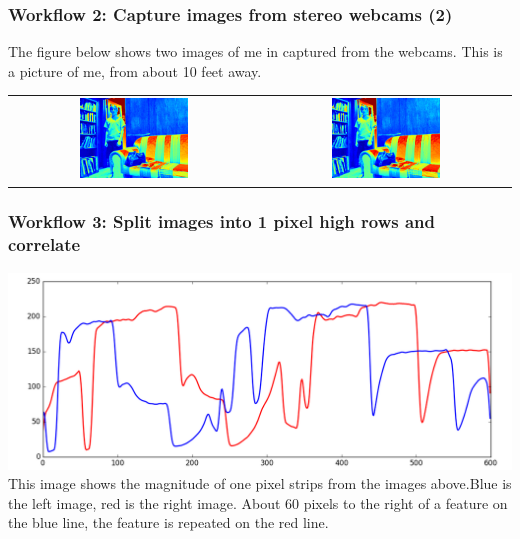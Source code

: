 \documentclass[19pt]{beamer}
\begin{document}
\begin{frame}
\frametitle{Workflow 2: Capture images from stereo webcams (2)}

The figure below shows two images of me in captured from the webcams. 
This is a picture of me, from about 10 feet away.\\[20pt]

\begin{center}
\setlength{}
\begin{tabular}{cc}
\includegraphics[width=0.45\textwidth]{images/l.png} &
\includegraphics[width=0.45\textwidth]{images/r.png} 
\end{tabular}
\end{center}

\end{frame}


\begin{frame}
\frametitle{Workflow 3: Split images into 1 pixel high rows and correlate}
\includegraphics[width=1\textwidth]{images/strips.png} \\[10pt]

This image shows the magnitude of one pixel strips from the images above.Blue is the left image, red is the right image. About 60 pixels to the right of a feature on the blue line, the feature is repeated on the red line.

\end{frame}
\end{document}

